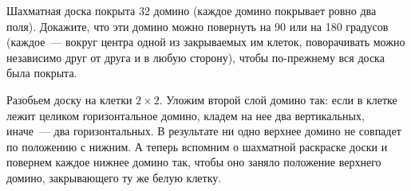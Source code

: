 \problem
Шахматная доска покрыта 32 домино (каждое домино покрывает ровно два поля).
Докажите, что эти домино можно повернуть на 90 или на 180 градусов
(каждое~--- вокруг центра одной из закрываемых им клеток, поворачивать можно
независимо друг от друга и в любую сторону), чтобы по-прежнему вся доска была
покрыта.

\solution
Разобьем доску на клетки $2 \times 2$.
Уложим второй слой домино так: если в клетке лежит целиком горизонтальное
домино, кладем на нее два вертикальных, иначе~--- два горизонтальных.
В результате ни одно верхнее домино не совпадет по положению с нижним.
А теперь вспомним о шахматной раскраске доски и повернем каждое нижнее домино
так, чтобы оно заняло положение верхнего домино, закрывающего ту же белую
клетку.
\endproblem
